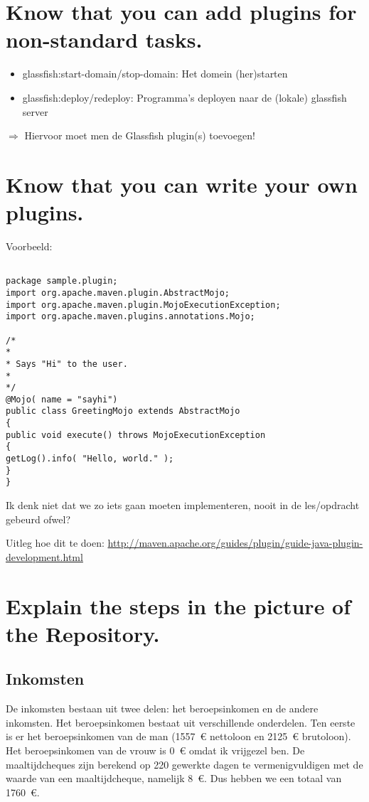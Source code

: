 \section{Know that you can add plugins for non-standard tasks.}

\begin{itemize}
	\item glassfish:start-domain/stop-domain: Het domein (her)starten
	\item glassfish:deploy/redeploy: Programma’s deployen naar de (lokale) glassfish server
\end{itemize}

$\Rightarrow$ Hiervoor moet men de Glassfish plugin(s) toevoegen!

\section{Know that you can write your own plugins.}


Voorbeeld:

\begin{verbatim}

package sample.plugin;
import org.apache.maven.plugin.AbstractMojo;
import org.apache.maven.plugin.MojoExecutionException;
import org.apache.maven.plugins.annotations.Mojo;

/*
*
* Says "Hi" to the user.
*
*/
@Mojo( name = "sayhi")
public class GreetingMojo extends AbstractMojo
{
public void execute() throws MojoExecutionException
{
getLog().info( "Hello, world." );
}
}
\end{verbatim}

Ik denk niet dat we zo iets gaan moeten implementeren, nooit in de les/opdracht gebeurd ofwel?

Uitleg hoe dit te doen: 
\url{http://maven.apache.org/guides/plugin/guide-java-plugin-development.html}

\section{Explain the steps in the picture of the Repository.}


\subsection{Inkomsten}

De inkomsten bestaan uit twee delen: het beroepsinkomen en de andere inkomsten.
Het beroepsinkomen bestaat uit verschillende onderdelen. Ten eerste is er het beroepsinkomen van de man (1557~\euro{} nettoloon en 2125~\euro{} brutoloon). Het beroepsinkomen van de vrouw is 0~\euro{} omdat ik vrijgezel ben. De maaltijdcheques zijn berekend op 220 gewerkte dagen te vermenigvuldigen met de waarde van een maaltijdcheque, namelijk 8~\euro{}. Dus hebben we een totaal van 1760~\euro{}.

